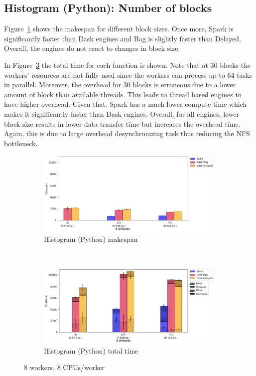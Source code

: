 \documentclass[conference]{IEEEtran}
\newcommand{\TG}[1]{\color{cyan}From Tristan: #1 \color{black}}
\begin{document}
\subsection{Histogram (Python): Number of blocks}
Figure~\ref{fig:histo_ms_block} shows the makespan for different block sizes. 
Once more, Spark is significantly faster than Dask engines and Bag is slightly
faster than Delayed. Overall, the engines do not react to changes in block size.

In Figure~\ref{fig:histo_tt_block} the total time for each function is shown.
Note that at 30 blocks the workers' resources are not fully used since the
workers can process up to 64 tasks in parallel. Moreover, the overhead for
30 blocks is erroneous due to a lower amount of block than available threads.
This leads to thread based engines to have higher overhead. Given that, 
Spark has a much lower compute time which makes it significantly faster
than Dask engines. Overall, for all engines, lower block size results in lower
data transfer time but increases the overhead time. Again, this is due to large overhead
desynchronizing task thus reducing the NFS bottleneck.


\begin{figure}[!t]
    \centering
    \begin{subfigure}[b]{\columnwidth}
        \includegraphics[clip,width=\columnwidth]{images/histo_block.png}%
        \caption{Histogram (Python) makespan}\label{fig:histo_ms_block}
    \end{subfigure}
    \\
    \begin{subfigure}[b]{\columnwidth}
        \includegraphics[clip,width=\columnwidth]{images/histo_idle_block.png}%
        \caption{Histogram (Python) total time}\label{fig:histo_tt_block}
    \end{subfigure}
    \caption{8 workers, 8 CPUs/worker}
\end{figure}
\end{document}
